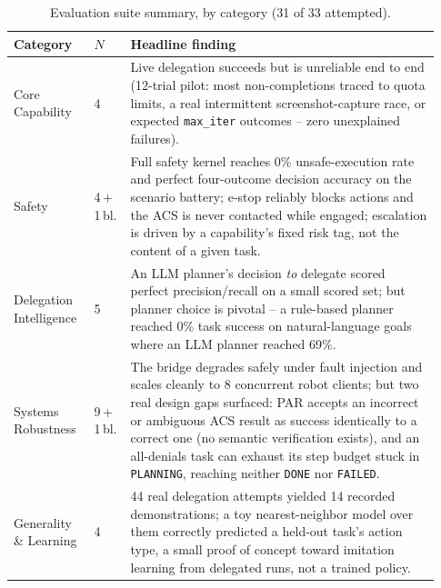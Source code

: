 \documentclass{article}
\begin{document}
\begin{table}[t]
\centering
\caption{Evaluation suite summary, by category (31 of 33 attempted).}
\label{tab:suite}
\small
\begin{tabular}{@{}p{0.17\linewidth}p{0.08\linewidth}p{0.68\linewidth}@{}}
\toprule
Category & $N$ & Headline finding \\
\midrule
Core Capability & 4 & Live delegation succeeds but is unreliable end to end (12-trial pilot: most non-completions traced to quota limits, a real intermittent screenshot-capture race, or expected \texttt{max\_iter} outcomes -- zero unexplained failures). \\
Safety & 4\,+\,1\,bl. & Full safety kernel reaches 0\% unsafe-execution rate and perfect four-outcome decision accuracy on the scenario battery; e-stop reliably blocks actions and the ACS is never contacted while engaged; escalation is driven by a capability's fixed risk tag, not the content of a given task. \\
Delegation Intelligence & 5 & An LLM planner's decision \emph{to} delegate scored perfect precision/recall on a small scored set; but planner choice is pivotal -- a rule-based planner reached 0\% task success on natural-language goals where an LLM planner reached 69\%. \\
Systems Robustness & 9\,+\,1\,bl. & The bridge degrades safely under fault injection and scales cleanly to 8 concurrent robot clients; but two real design gaps surfaced: PAR accepts an incorrect or ambiguous ACS result as success identically to a correct one (no semantic verification exists), and an all-denials task can exhaust its step budget stuck in \texttt{PLANNING}, reaching neither \texttt{DONE} nor \texttt{FAILED}. \\
Generality \& Learning & 4 & 44 real delegation attempts yielded 14 recorded demonstrations; a toy nearest-neighbor model over them correctly predicted a held-out task's action type, a small proof of concept toward imitation learning from delegated runs, not a trained policy. \\
\bottomrule
\end{tabular}
\end{table}
\end{document}
